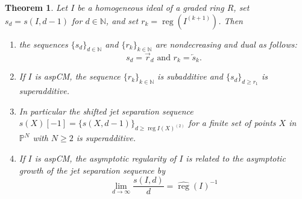 \documentclass[12pt, reqno]{amsart}
\numberwithin{equation}{section}
\newcommand{\N}{{\mathbb N}}
\renewcommand{\P}{{\mathbb P}}
\DeclareMathOperator{\reg}{reg}
\theoremstyle{plain} %
\newtheorem{thm}{Theorem}[section]
\theoremstyle{definition}
\theoremstyle{remark}
\newcommand{\so}{\overleftarrow{s}}
\begin{document}
\begin{thm}
\label{prop:superadd}
Let $I$ be a homogeneous ideal of a graded ring $R$, set $s_d=s(I,d-1)$ for $d\in \N$, and set $r_k=\reg(I^{(k+1)})$. Then 
\begin{enumerate}
\item the sequences $\{s_d\}_{d\in\N}$ and $\{r_k\}_{k\in\N}$ are nondecreasing and dual as follows: 
\[  s_d=\overrightarrow{r}_d \text{ and } r_k=\so_{k}. \]
\item If $I$ is  aspCM, the sequence $\{r_k\}_{k\in\N}$ is subadditive and $\{s_d\}_{d\geq r_1}$ is superadditive. 
\item In particular the shifted jet separation sequence $s(X)[-1]=\{s(X,d-1)\}_{d\geq \reg{I(X)^{(2)}}}$ for a finite set of points $X$ in $\P^N$ with $N\geq 2$ is superadditive.
\item If $I$ is aspCM, the asymptotic regularity of $I$ is related to the asymptotic growth of the jet separation sequence by 
\[
\lim_{d\to\infty} \frac{s(I,d)}{d}=\widehat{\reg}(I)^{-1}
\] 
\end{enumerate}
\end{thm}
\end{document}

